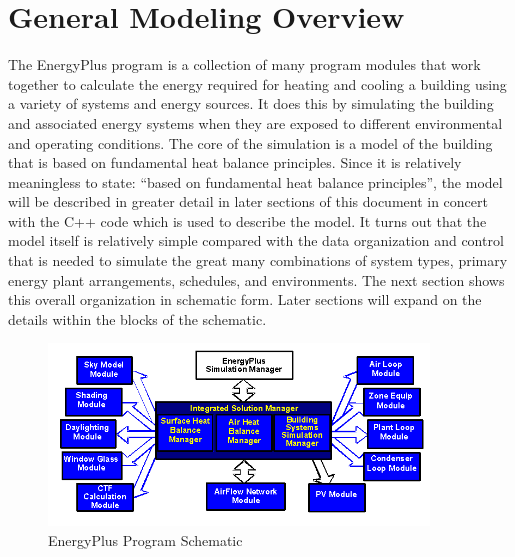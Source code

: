 \section{General Modeling Overview}\label{general-modeling-overview}

The EnergyPlus program is a collection of many program modules that work together to calculate the energy required for heating and cooling a building using a variety of systems and energy sources. It does this by simulating the building and associated energy systems when they are exposed to different environmental and operating conditions. The core of the simulation is a model of the building that is based on fundamental heat balance principles. Since it is relatively meaningless to state: ``based on fundamental heat balance principles'', the model will be described in greater detail in later sections of this document in concert with the C++ code which is used to describe the model. It turns out that the model itself is relatively simple compared with the data organization and control that is needed to simulate the great many combinations of system types, primary energy plant arrangements, schedules, and environments. The next section shows this overall organization in schematic form. Later sections will expand on the details within the blocks of the schematic.

\begin{figure}[hbtp] %
\centering
\includegraphics[width=0.9\textwidth, height=0.9\textheight, keepaspectratio=true]{media/image1.png}
\caption{EnergyPlus Program Schematic \protect \label{fig:energyplus-program-schematic}}
\end{figure}

